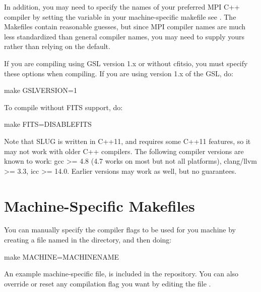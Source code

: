 \documentclass[letterpaper,10pt,english]{sphinxmanual}
\begin{document}
In addition, you may need to specify the names of your preferred MPI
C++ compiler by setting the variable  in your
machine-specific makefile \textendash{} see {\hyperref[\detokenize{compiling:ssec-machine-makefiles}]{}}. The
Makefiles contain reasonable guesses, but since MPI compiler names are
much less standardized than general compiler names, you may need to
supply yours rather than relying on the default.

If you are compiling using GSL version 1.x or without cfitsio, you
must specify these options when compiling. If you are using version
1.x of the GSL, do:

\begin{sphinxVerbatim}[commandchars=\\\{\}]
make GSLVERSION=1
\end{sphinxVerbatim}

To compile without FITS support, do:

\begin{sphinxVerbatim}[commandchars=\\\{\}]
make FITS=DISABLE\PYGZus{}FITS
\end{sphinxVerbatim}

Note that SLUG is written in C++11, and requires some C++11 features,
so it may not work with older C++ compilers. The following compiler
versions are known to work: gcc \textgreater{}= 4.8 (4.7 works on most but not all
platforms), clang/llvm \textgreater{}= 3.3, icc \textgreater{}= 14.0. Earlier versions may work
as well, but no guarantees.


\section{Machine-Specific Makefiles}
\label{\detokenize{compiling:machine-specific-makefiles}}\label{\detokenize{compiling:ssec-machine-makefiles}}
You can manually specify the compiler flags to be used for you machine
by creating a file named  in the 
directory, and then doing:

\begin{sphinxVerbatim}[commandchars=\\\{\}]
make MACHINE=MACHINE\PYGZus{}NAME
\end{sphinxVerbatim}

An example machine-specific file,  is
included in the repository. You can also override or reset any
compilation flag you want by editing the file
.
\end{document}
